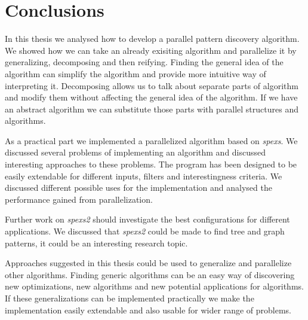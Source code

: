 \chapter{Conclusions}
\label{c:conclusions}

In this thesis we analysed how to develop a parallel pattern discovery algorithm. We showed how we can take an already exisiting algorithm and parallelize it by generalizing, decomposing and then reifying. Finding the general idea of the algorithm can simplify the algorithm and provide more intuitive way of interpreting it. Decomposing allows us to talk about separate parts of algorithm and modify them without affecting the general idea of the algorithm. If we have an abstract algorithm we can substitute those parts with parallel structures and algorithms.

As a practical part we implemented a parallelized algorithm based on \emph{spexs}\cite{spexs}. We discussed several problems of implementing an algorithm and discussed interesting approaches to these problems. The program has been designed to be easily extendable for different inputs, filters and interestingness criteria. We discussed different possible uses for the implementation and analysed the performance gained from parallelization.

Further work on \emph{spexs2} should investigate the best configurations for different applications. We discussed that \emph{spexs2} could be made to find tree and graph patterns, it could be an interesting research topic.

Approaches suggested in this thesis could be used to generalize and parallelize other algorithms. Finding generic algorithms can be an easy way of discovering new optimizations, new algorithms and new potential applications for algorithms. If these generalizations can be implemented practically we make the implementation easily extendable and also usable for wider range of problems.